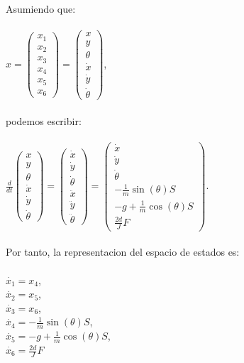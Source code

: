 \documentclass{article}
\begin{document}
\begin{itemize}
Asumiendo que:\\\\
		$x = 
			\begin{pmatrix}
				 x_1\\x_2\\x_3\\x_4\\x_5\\x_6
			\end{pmatrix}
		 		= 
			\begin{pmatrix}
				 x\\y\\\theta\\\dot{x}\\\dot{y}\\\dot{\theta}
			\end{pmatrix}$,\\\\
podemos escribir:\\\\
		$\frac{d}{dt}
			\begin{pmatrix}
				 x\\y\\\theta\\\dot{x}\\\dot{y}\\\dot{\theta}
			\end{pmatrix}
				=
			\begin{pmatrix}
				 \dot{x}\\\dot{y}\\\dot{\theta}\\\ddot{x}\\\ddot{y}\\\ddot{\theta}
			\end{pmatrix}
				=
			\begin{pmatrix}
				 \dot{x}\\\dot{y}\\\dot{\theta}\\-\frac{1}{m}\sin(\theta)S\\-g+\frac{1}{m}\cos (\theta)S\\\frac{2d}{J}F
			\end{pmatrix}$.\\\\
Por tanto, la representacion del espacio de estados es:\\\\
	$\dot{x_1}=x_4$,\\
	$\dot{x_2}=x_5$,\\
	$\dot{x_3}=x_6$,\\
	$\dot{x_4}=-\frac{1}{m}\sin(\theta)S$,\\
	$\dot{x_5}=-g+\frac{1}{m}\cos (\theta)S$,\\
	$\dot{x_6}=\frac{2d}{J}F$\\	



\end{itemize}
\end{document}
